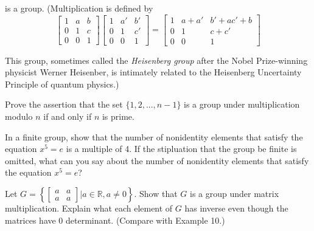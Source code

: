 \documentclass[11pt,largemargins]{homework}
\begin{document}
is a group. (Multiplication is defined by 
\[
\begin{bmatrix}
    1 & a & b \\
    0 & 1 & c \\
    0 & 0 & 1
\end{bmatrix}
\begin{bmatrix}
    1 & a' & b' \\
    0 & 1 & c' \\
    0 & 0 & 1
\end{bmatrix}
=
\begin{bmatrix}
    1 & a+a' & b'+ac'+b  \\
    0 & 1    & c+c' \\
    0 & 0    & 1
\end{bmatrix}
\]

This group, sometimes called the \textit{Heisenberg group} after the Nobel Prize-winning physicist Werner Heisenber, 
is intimately related to the Heisenberg Uncertainty Principle of quantum physics.)

\question 
Prove the assertion that the set $\{1,2,...,n-1\}$ is a group under multiplication modulo $n$ if and only if $n$ is 
prime.

\question 
In a finite group, show that the number of nonidentity elements that satisfy the equation $x^5=e$ is a multiple of 4. 
If the stipluation that the group be finite is omitted, what can you say about the number of nonidentity elements 
that satisfy the equation $x^5=e$?

\question 
Let $G=\left\{
\begin{bmatrix} 
    a & a \\ 
    a & a 
\end{bmatrix} | a \in \mathbb{R}, a \neq 0 \right\}$.
Show that $G$ is a group under matrix multiplication. Explain what each element of $G$ has inverse even though the matrices 
have 0 determinant. (Compare with Example 10.)
\end{document}
